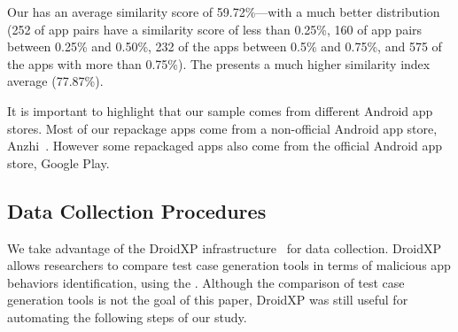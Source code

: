 Our \cds has an average similarity score of 59.72\%---with a much better distribution {\color{red}(252 of
app pairs have a similarity score of less than 0.25\%, 160 of app pairs
between 0.25\% and 0.50\%, 232 of the apps between 0.5\% and 0.75\%,
and 575 of the apps with more than 0.75\%). The \sds presents a much higher
similarity index average (77.87\%)}. 

It is important to highlight that our sample comes
from different Android app stores. Most of our repackage apps come from a non-official
Android app store, Anzhi~\cite{anzhi}. However some repackaged apps also come from the
official Android app store, Google Play.




\subsection{Data Collection Procedures} \label{sec:dataCollectionProc}

We take advantage of the DroidXP infrastructure~\cite{DBLP:conf/scam/CostaMCMVBC20}
for data collection. DroidXP allows researchers to compare 
test case generation tools in terms of malicious app behaviors identification, using the \mas. Although the comparison of test
case generation tools is not the goal of this paper, DroidXP
was still useful for automating the following steps of our study.


